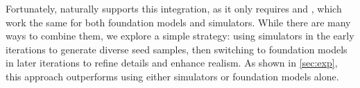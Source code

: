 Fortunately, \pe{} naturally supports this integration, as it only requires \randomsampleapiname{} and \samplevariationapiname{}, which work the same for both foundation models and simulators. While there are many ways to combine them, we explore a simple strategy: using simulators in the early \pe{} iterations to generate diverse seed samples, then switching to foundation models in later iterations to refine details and enhance realism. As shown in \cref{sec:exp}, this approach outperforms using either simulators or foundation models alone.

